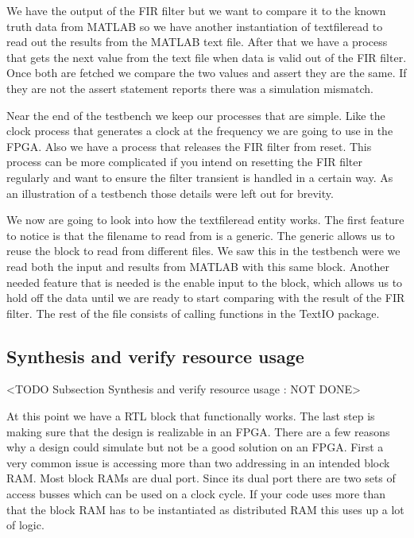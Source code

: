 We have the output of the \ac{FIR} filter but we want to compare it to the known truth data from MATLAB so we have another instantiation of textfileread to read out the results from the MATLAB text file. After that we have a process that gets the next value from the text file when data is valid out of the \ac{FIR} filter. Once both are fetched we compare the two values and assert they are the same. If they are not the assert statement reports there was a simulation mismatch.

Near the end of the testbench we keep our processes that are simple. Like the clock process that generates a clock at the frequency we are going to use in the \ac{FPGA}. Also we have a process that releases the \ac{FIR} filter from reset. This process can be more complicated if you intend on resetting the \ac{FIR} filter regularly and want to ensure the filter transient is handled in a certain way. As an illustration of a testbench those details were left out for brevity.

We now are going to look into how the textfileread entity works. The first feature to notice is that the filename to read from is a generic. The generic allows us to reuse the block to read from different files. We saw this in the testbench were we read both the input and results from MATLAB with this same block. Another needed feature that is needed is the enable input to the block, which allows us to hold off the data until we are ready to start comparing with the result of the \ac{FIR} filter. The rest of the file consists of calling functions in the TextIO package.

	
	
	
\subsection{Synthesis and verify resource usage}
	<TODO Subsection Synthesis and verify resource usage : NOT DONE>

At this point we have a \ac{RTL} block that functionally works. The last step is making sure that the design is realizable in an \ac{FPGA}. There are a few reasons why a design could simulate but not be a good solution on an \ac{FPGA}. First a very common issue is accessing more than two addressing in an intended block \ac{RAM}. Most block \ac{RAM}s are dual port. Since its dual port there are two sets of access busses which can be used on a clock cycle. If your code uses more than that the block \ac{RAM} has to be instantiated as distributed \ac{RAM} this uses up a lot of logic.

